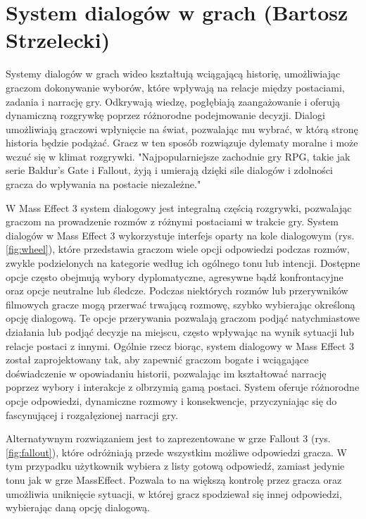 \section{System dialogów w grach (Bartosz Strzelecki)}\label{chap:dialogi}
Systemy dialogów w grach wideo kształtują wciągającą historię, umożliwiając graczom dokonywanie wyborów, które wpływają na relacje między postaciami, zadania i narrację gry. 
Odkrywają wiedzę, pogłębiają zaangażowanie i oferują dynamiczną rozgrywkę poprzez różnorodne podejmowanie decyzji.
Dialogi umożliwiają graczowi wpłynięcie na świat, pozwalając mu wybrać, w którą stronę historia będzie podążać.
Gracz w ten sposób rozwiązuje dylematy moralne i może wczuć się w klimat rozgrywki.
"Najpopularniejsze zachodnie gry RPG, takie jak serie Baldur's Gate i Fallout, żyją i umierają dzięki sile dialogów i zdolności gracza do wpływania na postacie niezależne."\cite{dialogue}

W Mass Effect 3 system dialogowy jest integralną częścią rozgrywki, pozwalając graczom na prowadzenie rozmów z różnymi postaciami w trakcie gry.
System dialogów w Mass Effect 3 wykorzystuje interfejs oparty na kole dialogowym (rys. \ref{fig:wheel}), które
przedstawia graczom wiele opcji odpowiedzi podczas rozmów, zwykle podzielonych na kategorie według ich ogólnego tonu lub intencji.
Dostępne opcje często obejmują wybory dyplomatyczne, agresywne bądź konfrontacyjne oraz opcje neutralne lub śledcze.
Podczas niektórych rozmów lub przerywników filmowych gracze mogą przerwać trwającą rozmowę, szybko wybierając określoną opcję dialogową.
Te opcje przerywania pozwalają graczom podjąć natychmiastowe działania lub podjąć decyzje na miejscu, często wpływając na wynik sytuacji lub relacje postaci z innymi.
Ogólnie rzecz biorąc, system dialogowy w Mass Effect 3 został zaprojektowany tak, aby zapewnić graczom bogate i wciągające doświadczenie w opowiadaniu historii,
pozwalając im kształtować narrację poprzez wybory i interakcje z olbrzymią gamą postaci. System oferuje różnorodne opcje odpowiedzi, dynamiczne rozmowy i konsekwencje,
przyczyniając się do fascynującej i rozgałęzionej narracji gry.

Alternatywnym rozwiązaniem jest to zaprezentowane w grze Fallout 3 (rys. \ref{fig:fallout}), które odróżniają przede wszystkim możliwe odpowiedzi gracza.
W tym przypadku użytkownik wybiera z listy gotową odpowiedź, zamiast jedynie tonu jak w grze MassEffect. Pozwala to na większą kontrolę
przez gracza oraz umożliwia uniknięcie sytuacji, w której gracz spodziewał się innej odpowiedzi, wybierając daną opcję dialogową.

